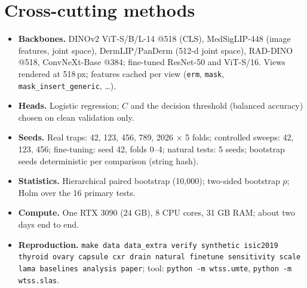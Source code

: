 \documentclass[10pt,a4paper]{article}
\begin{document}
\section{Cross-cutting methods}
\begin{itemize}[leftmargin=*]\itemsep1pt
\item \textbf{Backbones.} DINOv2 ViT-S/B/L-14 @518 (CLS), MedSigLIP-448 (image features, joint space), DermLIP/PanDerm (512-d
joint space), RAD-DINO @518, ConvNeXt-Base @384; fine-tuned ResNet-50 and ViT-S/16. Views rendered at 518\,px; features
cached per view (\texttt{erm}, \texttt{mask}, \texttt{mask\_insert\_generic}, \ldots).
\item \textbf{Heads.} Logistic regression; $C$ and the decision threshold (balanced accuracy) chosen on clean validation only.
\item \textbf{Seeds.} Real traps: 42, 123, 456, 789, 2026 $\times$ 5 folds; controlled sweeps: 42, 123, 456; fine-tuning:
seed 42, folds 0--4; natural tests: 5 seeds; bootstrap seeds deterministic per comparison (string hash).
\item \textbf{Statistics.} Hierarchical paired bootstrap (10{,}000); two-sided bootstrap $p$; Holm over the 16 primary tests.
\item \textbf{Compute.} One RTX 3090 (24 GB), 8 CPU cores, 31 GB RAM; about two days end to end.
\item \textbf{Reproduction.} \texttt{make data data\_extra verify synthetic isic2019 thyroid ovary capsule cxr drain natural
finetune sensitivity scale lama baselines analysis paper}; tool: \texttt{python -m wtss.umte}, \texttt{python -m wtss.slas}.
\end{itemize}
\end{document}

